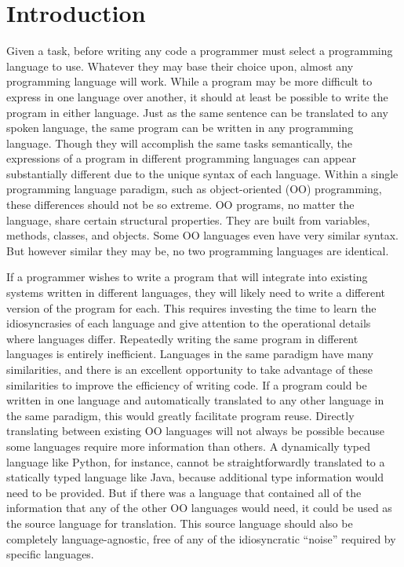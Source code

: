 \documentclass[sigplan,review,anonymous]{acmart}\settopmatter{printfolios=true,printccs=false,printacmref=false}
\begin{document}
\section{Introduction}

Given a task, before writing any code a programmer must select a programming 
language to use. Whatever they may base their choice upon, almost any
programming language will work. While a program may be more difficult to
express in one language over another, it should at least be possible to write
the program in either language. Just as the same sentence can be translated to
any spoken language, the same program can be written in any programming
language. Though they will accomplish the same tasks semantically, the
expressions of a program in different programming languages can appear
substantially different due to the unique syntax of each language. Within a
single programming language paradigm, such as object-oriented (OO) programming,
these differences should not be so extreme. OO programs, no matter the
language, share certain structural properties. They are built from variables,
methods, classes, and objects. Some OO languages even have very similar syntax.
But however similar they may be, no two programming languages are identical.

If a programmer wishes to write a program that will integrate into 
existing systems written in different languages, they will likely need to 
write a different version of the program for each. This 
requires investing the time to learn the idiosyncrasies of each language and 
give attention to the operational details where languages differ. Repeatedly 
writing the same program in different languages is entirely inefficient. 
Languages in the same paradigm have many similarities, and there is an 
excellent opportunity to take advantage of these similarities to improve the
efficiency of writing code. If a program could be written in one language and
automatically translated to any other language in the same paradigm, this would
greatly facilitate program reuse. Directly translating between existing 
OO languages will not always be possible because some languages 
require more information than others. A dynamically typed language like Python, 
for instance, cannot be straightforwardly translated to a statically typed 
language like Java, because additional type information would need to be 
provided. But if there was a language that contained all of the information 
that any of the other OO languages would need, it could be used as the source 
language for translation. This source language should also be completely 
language-agnostic, free of any of the idiosyncratic ``noise'' required by
specific languages.
\end{document}
